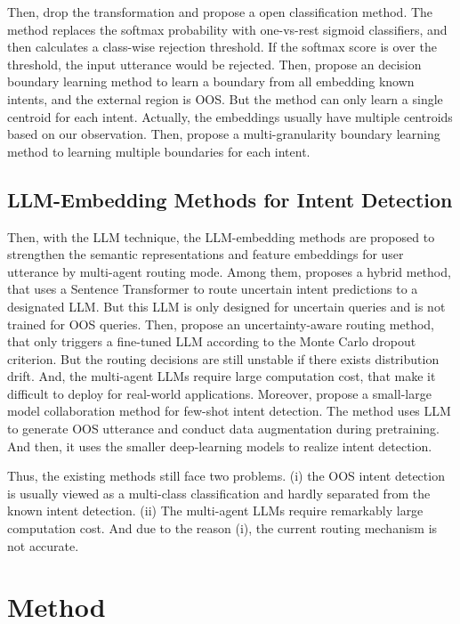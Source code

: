 \documentclass[11pt]{article}
\begin{document}
Then, \citet{shu2017doc} drop the transformation and propose a open classification method. The method replaces the softmax probability with one-vs-rest sigmoid classifiers, and then calculates a class-wise rejection threshold. If the softmax score is over the threshold, the input utterance would be rejected. Then, \citet{zhang2021adaptive} propose an decision boundary learning method to learn a boundary from all embedding known intents, and the external region is OOS. But the method can only learn a single centroid for each intent. Actually, the embeddings usually have multiple centroids based on our observation. Then, \citet{li2025multi} propose a multi-granularity boundary learning method to learning multiple boundaries for each intent.


\subsection{LLM-Embedding Methods for Intent Detection}
Then, with the LLM technique, the LLM-embedding methods are proposed to strengthen the semantic representations and feature embeddings for user utterance by multi-agent routing mode. Among them, \citet{arora2024intent} proposes a hybrid method, that uses a Sentence Transformer to route uncertain intent predictions to a designated LLM. But this LLM is only designed for uncertain queries and is not trained for OOS queries. Then, \citet{zaera2025efficient} propose an uncertainty-aware routing method, that only triggers a fine-tuned LLM according to the Monte Carlo dropout criterion. But the routing decisions are still unstable if there exists distribution drift. And, the multi-agent LLMs require large computation cost, that make it difficult to deploy for real-world applications. Moreover, \citet{chen2025collaborating} propose a small-large model collaboration method for few-shot intent detection. The method uses LLM to generate OOS utterance and conduct data augmentation during pretraining. And then, it uses the smaller deep-learning models to realize intent detection. 

Thus, the existing methods still face two problems. (i) the OOS intent detection is usually viewed as a multi-class classification and hardly separated from the known intent detection. (ii) The multi-agent LLMs require remarkably large computation cost. And due to the reason (i), the current routing mechanism is not accurate. 


\section{Method}
\end{document}
